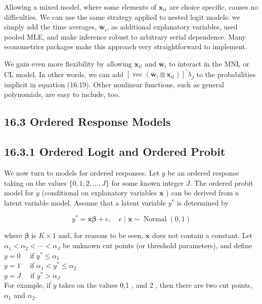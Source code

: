 \documentclass[10pt]{article}
\begin{document}
Allowing a mixed model, where some elements of $\mathbf{x}_{i t}$ are choice specific, causes no difficulties. We can use the same strategy applied to nested logit models: we simply add the time averages, $\overline{\mathbf{w}}_{i}$, as additional explanatory variables, used pooled MLE, and make inference robust to arbitrary serial dependence. Many econometrics packages make this approach very straightforward to implement.

We gain even more flexibility by allowing $\mathbf{x}_{i t}$ and $\overline{\mathbf{w}}_{i}$ to interact in the MNL or CL model. In other words, we can add $\left[\operatorname{vec}\left(\overline{\mathbf{w}}_{i} \otimes \mathbf{x}_{i t}\right)\right]^{\prime} \lambda_{j}$ to the probabilities implicit in equation (16.19). Other nonlinear functions, such as general polynomials, are easy to include, too.

\subsection*{16.3 Ordered Response Models}
\subsection*{16.3.1 Ordered Logit and Ordered Probit}
We now turn to models for ordered responses. Let $y$ be an ordered response taking on the values $\{0,1,2, \ldots, J\}$ for some known integer $J$. The ordered probit model for $y$ (conditional on explanatory variables $\mathbf{x}$ ) can be derived from a latent variable model. Assume that a latent variable $y^{*}$ is determined by


\begin{equation*}
y^{*}=\mathbf{x} \boldsymbol{\beta}+e, \quad e \mid \mathbf{x} \sim \operatorname{Normal}(0,1) \tag{16.21}
\end{equation*}


where $\boldsymbol{\beta}$ is $K \times 1$ and, for reasons to be seen, $\mathbf{x}$ does not contain a constant. Let $\alpha_{1}<\alpha_{2}<\cdots<\alpha_{J}$ be unknown cut points (or threshold parameters), and define\\
$y=0 \quad$ if $y^{*} \leq \alpha_{1}$\\
$y=1 \quad$ if $\alpha_{1}<y^{*} \leq \alpha_{2}$\\
$y=J \quad$ if $y^{*}>\alpha_{J}$\\
For example, if $y$ takes on the values 0,1 , and 2 , then there are two cut points, $\alpha_{1}$ and $\alpha_{2}$.
\end{document}
